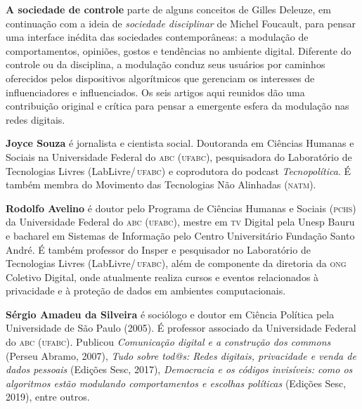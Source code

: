 \textbf{A sociedade de controle} parte de alguns conceitos de Gilles Deleuze, em continuação com a ideia de \textit{sociedade disciplinar} de Michel Foucault, para pensar uma interface inédita das sociedades contemporâneas: a modulação de comportamentos, opiniões, gostos e tendências no ambiente digital. Diferente do controle ou da disciplina, a modulação conduz seus usuários por caminhos oferecidos pelos dispositivos algorítmicos que gerenciam os
interesses de influenciadores e influenciados. Os seis artigos aqui reunidos dão uma contribuição original e crítica para pensar a emergente esfera da modulação nas redes digitais.

\textbf{Joyce Souza} é jornalista e cientista social. Doutoranda em Ciências Humanas e Sociais na Universidade Federal do \textsc{abc} (\textsc{ufabc}), pesquisadora do Laboratório de Tecnologias Livres (LabLivre/\,\textsc{ufabc}) e coprodutora do podcast \textit{Tecnopolítica}. É também membra do Movimento das Tecnologias Não Alinhadas (\textsc{natm}). 

\textbf{Rodolfo Avelino} é doutor pelo Programa de Ciências Humanas e Sociais (\textsc{pchs}) da Universidade Federal do \textsc{abc} (\textsc{ufabc}), mestre em \textsc{tv} Digital pela Unesp Bauru e bacharel em Sistemas de Informação pelo Centro Universitário Fundação Santo André. É também professor do Insper e pesquisador no Laboratório de Tecnologias Livres (LabLivre/\,\textsc{ufabc}), além de componente da diretoria da \textsc{ong} Coletivo Digital, onde atualmente realiza cursos e eventos relacionados à privacidade e à proteção de dados em ambientes computacionais.

\textbf{Sérgio Amadeu da Silveira} é sociólogo e doutor em Ciência Política pela Universidade de São Paulo (2005). É professor associado da Universidade Federal do \textsc{abc} (\textsc{ufabc}). Publicou \textit{Comunicação digital e a construção dos commons} (Perseu Abramo, 2007), \textit{Tudo sobre tod@s: Redes digitais, privacidade e venda de dados pessoais} (Edições Sesc, 2017), \textit{Democracia e os códigos invisíveis: como os algoritmos estão modulando comportamentos e escolhas políticas} (Edições Sesc, 2019), entre outros.

